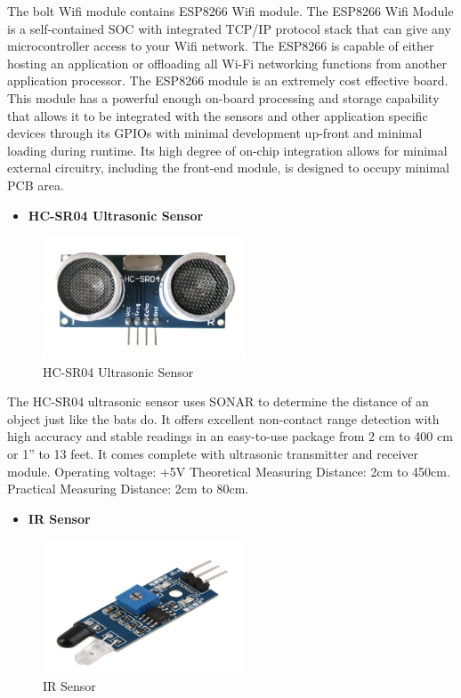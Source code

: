  The bolt Wifi module contains ESP8266 Wifi module. The ESP8266 Wifi Module is a self-contained SOC with integrated TCP/IP protocol stack that can give any microcontroller access to your Wifi network. The ESP8266 is capable of either hosting an application or offloading all Wi-Fi networking functions from another application processor. The ESP8266 module is an extremely cost effective board. This module has a powerful enough on-board processing and storage capability that allows it to be integrated with the sensors and other application specific devices through its GPIOs with minimal development up-front and minimal loading during runtime. Its high degree of on-chip integration allows for minimal external circuitry, including the front-end module, is designed to occupy minimal PCB area.
 
\newpage
\begin{itemize}
 	\item \Large\textbf {HC-SR04 Ultrasonic Sensor}
 \end{itemize}
 
	\begin{figure}[h]
		\centering
	\includegraphics[width=60mm,scale=1]{43}
	\caption{HC-SR04 Ultrasonic Sensor}
	\label{HC-SR04 Ultrasonic Sensor}
	
\end{figure}

 The HC-SR04 ultrasonic sensor uses SONAR to determine the distance of an object just like the bats do. It offers excellent non-contact range detection with high accuracy and stable readings in an easy-to-use package from 2 cm to 400 cm or 1” to 13 feet.  It comes complete with ultrasonic transmitter and receiver module. Operating voltage: +5V  Theoretical Measuring Distance: 2cm to 450cm. Practical Measuring Distance: 2cm to 80cm.
 
\newpage
\begin{itemize}
 	\item \Large\textbf {IR Sensor}
 \end{itemize}
 
	\begin{figure}[h]
		\centering
	\includegraphics[width=60mm,scale=1]{44}
	\caption{IR Sensor}
	\label{IR Sensor}
	
\end{figure}

